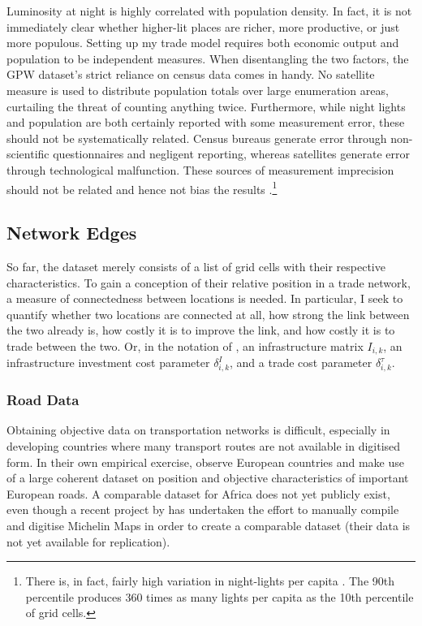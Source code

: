\documentclass[11pt, oneside]{article}   	%
\begin{document}
Luminosity at night is highly correlated with population density. In fact, it is not immediately clear whether higher-lit places are richer, more productive, or just more populous. Setting up my trade model requires both economic output and population to be independent measures. When disentangling the two factors, the GPW dataset's strict reliance on census data comes in handy. No satellite measure is used to distribute population totals over large enumeration areas, curtailing the threat of counting anything twice. Furthermore, while night lights and population are both certainly reported with some measurement error, these should not be systematically related. Census bureaus generate error through non-scientific questionnaires and negligent reporting, whereas satellites generate error through technological malfunction. These sources of measurement imprecision should not be related and hence not bias the results \citep[see also][]{Pinkovskiy_LightsCameraIncome_2016}.\footnote{There is, in fact, fairly high variation in night-lights per capita \citep[a measure which should be employed with scientific caution and is only reported here for illustrative purposes, see][]{michalopoulos_spatial_2018}. The 90th percentile produces 360 times as many lights per capita as the 10th percentile of grid cells.}

\subsection{Network Edges}
So far, the dataset merely consists of a list of grid cells with their respective characteristics. To gain a conception of their relative position in a trade network, a measure of connectedness between locations is needed. In particular, I seek to quantify whether two locations are connected at all, how strong the link between the two already is, how costly it is to improve the link, and how costly it is to trade between the two. Or, in the notation of \cite{fajgelbaum_optimal_2017}, an infrastructure matrix $I_{i,k}$, an infrastructure investment cost parameter $\delta_{i,k}^{I}$, and a trade cost parameter $\delta_{i,k}^{\tau}$.

\subsubsection{Road Data}
\label{sec:road_data}
Obtaining objective data on transportation networks is difficult, especially in developing countries where many transport routes are not available in digitised form. In their own empirical exercise, \citeauthor{fajgelbaum_optimal_2017} observe European countries and make use of a large coherent dataset on position and objective characteristics of important European roads. A comparable dataset for Africa does not yet publicly exist, even though a recent project by \cite{jedwab_average_2017} has undertaken the effort to manually compile and digitise Michelin Maps in order to create a comparable dataset (their data is not yet available for replication).
\end{document}
